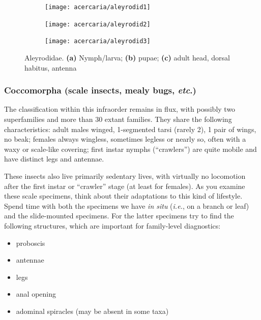 \begin{figure}[ht!]
 \centering
 \begin{subfigure}[ht!]{0.12\textwidth}
  \texttt{[image: acercaria/aleyrodid1]}
  \caption{}
  \label{fig:aleyrodid1}
 \end{subfigure}
 \hfill
 \begin{subfigure}[ht!]{0.3\textwidth}
  \texttt{[image: acercaria/aleyrodid2]}
  \caption{}
  \label{fig:aleyrodid2}
 \end{subfigure}
 \hfill
 \begin{subfigure}[ht!]{0.53\textwidth}
  \texttt{[image: acercaria/aleyrodid3]}
  \caption{}
  \label{fig:aleyrodid3}
 \end{subfigure}
 \caption{Aleyrodidae. \textbf{(a)} Nymph/larva; \textbf{(b)} pupae; \textbf{(c)} adult head, dorsal habitus, antenna \citep[][Figs. 8,9]{bhlitem192425}}\label{fig:aleyrodid}
\end{figure}

\subsubsection{Coccomorpha (scale insects, mealy bugs, \textit{etc}.)}
\noindent{}The classification within this infraorder remains in flux, with possibly two superfamilies and more than 30 extant families. They share the following characteristics: adult males winged, 1-segmented tarsi (rarely 2), 1 pair of wings, no beak; females always wingless, sometimes legless or nearly so, often with a waxy or scale-like covering; first instar nymphs (``crawlers'') are quite mobile and have distinct legs and antennae.\vspace{3mm}

\noindent{}These insects also live primarily sedentary lives, with virtually no locomotion after the first instar or ``crawler'' stage (at least for females). As you examine these scale specimens, think about their adaptations to this kind of lifestyle. Spend time with both the specimens we have \textit{in situ} (\textit{i.e.}, on a branch or leaf) and the slide-mounted specimens. For the latter specimens try to find the following structures, which are important for family-level diagnostics:
\begin{itemize}
    \item proboscis
    \item antennae
    \item legs
    \item anal opening
    \item adominal spiracles (may be absent in some taxa)
\end{itemize}

